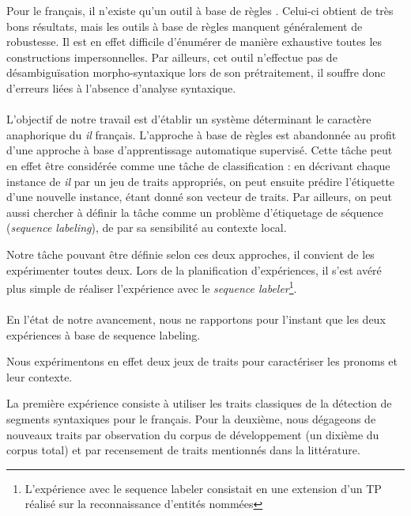 \documentclass[a4paper,12pt]{article}
\begin{document}
Pour le français, il n'existe qu'un outil à base de règles \citep{danlos-ilimp-taln2005}. Celui-ci obtient de très bons résultats, mais les outils à base de règles manquent généralement de robustesse. Il est en effet difficile d'énumérer de manière exhaustive toutes les constructions impersonnelles. Par ailleurs, cet outil n'effectue pas de désambiguïsation morpho-syntaxique lors de son prétraitement, il souffre donc d'erreurs liées à l'absence d'analyse syntaxique.

\paragraph{}
L'objectif de notre travail est d'établir un système déterminant le caractère anaphorique du \og{}\textit{il}\fg{} français. L'approche à base de règles est abandonnée au profit d'une approche à base d'apprentissage automatique supervisé. Cette tâche peut en effet être considérée comme une tâche de classification : en décrivant chaque instance de \og \textit{il} \fg{} par un jeu de traits appropriés, on peut ensuite prédire l'étiquette d'une nouvelle instance, étant donné son vecteur de traits. Par ailleurs, on peut aussi chercher à définir la tâche comme un problème d'étiquetage de séquence (\emph{sequence labeling}), de par sa sensibilité au contexte local.

Notre tâche pouvant être définie selon ces deux approches, il convient de les expérimenter toutes deux. Lors de la planification d'expériences, il s'est avéré plus simple de réaliser l'expérience avec le \emph{sequence labeler}\footnote{\samepage L'expérience avec le sequence labeler consistait en une extension d'un TP réalisé sur la reconnaissance d'entités nommées}.

\paragraph{}
En l'état de notre avancement, nous ne rapportons pour l'instant que les deux expériences à base de sequence labeling.

Nous expérimentons en effet deux jeux de traits pour caractériser les pronoms et leur contexte.

La première expérience consiste à utiliser les traits classiques de la détection de segments syntaxiques pour le français. Pour la deuxième, nous dégageons de nouveaux traits par observation du corpus de développement (un dixième du corpus total) et par recensement de traits mentionnés dans la littérature.
\end{document}
